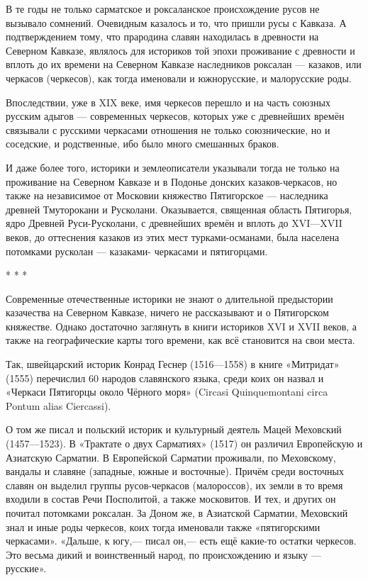В те годы не только сарматское и роксаланское происхождение русов не вызывало
сомнений. Очевидным казалось и то, что пришли русы с Кавказа. А подтверждением
тому, что прародина славян находилась в древности на Северном Кавказе, являлось
для историков той эпохи проживание с древности и вплоть до их времени на
Северном Кавказе наследников роксалан — казаков, или черкасов (черкесов), как
тогда именовали и южнорусские, и малорусские роды.

Впоследствии, уже в XIX веке, имя черкесов перешло и на часть союзных русским
адыгов — современных черкесов, которых уже с древнейших времён связывали с
русскими черкасами отношения не только союзнические, но и соседские, и
родственные, ибо было много смешанных браков.

И даже более того, историки и землеописатели указывали тогда не только на
проживание на Северном Кавказе и в Подонье донских казаков-черкасов, но также
на независимое от Московии княжество Пятигорское — наследника древней
Тмуторокани и Русколани. Оказывается, священная область Пятигорья, ядро Древней
Руси-Русколани, с древнейших времён и вплоть до XVI—XVII веков, до оттеснения
казаков из этих мест турками-османами, была населена потомками русколан —
казаками- черкасами и пятигорцами.

* * *

Современные отечественные историки не знают о длительной предыстории казачества
на Северном Кавказе, ничего не рассказывают и о Пятигорском княжестве. Однако
достаточно заглянуть в книги историков XVI и XVII веков, а также на
географические карты того времени, как всё становится на свои места.

Так, швейцарский историк Конрад Геснер (1516—1558) в книге «Митридат» (1555)
перечислил 60 народов славянского языка, среди коих он назвал и «Черкаси
Пятигорцы около Чёрного моря» (Circasi Quinquemontani circa Pontum alias
Ciercassi).

О том же писал и польский историк и культурный деятель Мацей Меховский
(1457—1523). В «Трактате о двух Сарматиях» (1517) он различил Европейскую и
Азиатскую Сарматии. В Европейской Сарматии проживали, по Меховскому, вандалы и
славяне (западные, южные и восточные). Причём среди восточных славян он выделил
группы русов-черкасов (малороссов), их земли в то время входили в состав Речи
Посполитой, а также московитов. И тех, и других он почитал потомками роксалан.
За Доном же, в Азиатской Сарматии, Меховский знал и иные роды черкесов, коих
тогда именовали также «пятигорскими черкасами». «Дальше, к югу,— писал он,—
есть ещё какие-то остатки черкесов. Это весьма дикий и воинственный народ, по
происхождению и языку — русские».

